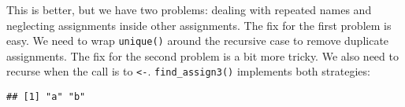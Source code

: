 This is better, but we have two problems: dealing with repeated names
and neglecting assignments inside other assignments. The fix for the
first problem is easy. We need to wrap \texttt{unique()} around the
recursive case to remove duplicate assignments. The fix for the second
problem is a bit more tricky. We also need to recurse when the call is
to \texttt{\textless{}-}. \texttt{find\_assign3()} implements both
strategies:

\begin{Shaded}
\begin{Highlighting}[]
\StringTok{ }
  \NormalTok{ (}\OperatorTok{||}\StringTok{ }
    \NormalTok{()}
\NormalTok{  \} } \NormalTok{ (}
    \NormalTok{ (}\NormalTok{(x[[}\NormalTok{]], }\NormalTok{(}\DataTypeTok{<-}\NormalTok{))) \{}
\StringTok{ }\NormalTok{(x[[}\NormalTok{]])}
\NormalTok{    \} }\NormalTok{ \{}
\StringTok{ }\NormalTok{()}
\NormalTok{    \}}

    \NormalTok{(}\NormalTok{(}
\NormalTok{  \} } \NormalTok{ (}
    \NormalTok{(}\NormalTok{(}
\NormalTok{  \} }\NormalTok{ \{}
    \NormalTok{(}\NormalTok{, }
       \NormalTok{)}
\NormalTok{  \}}
\NormalTok{\}}

\NormalTok{(}\NormalTok{(\{}
\StringTok{ }
\StringTok{ }
\StringTok{ }
\NormalTok{\}))}
\end{Highlighting}
\end{Shaded}

\begin{verbatim}
## [1] "a" "b"
\end{verbatim}

